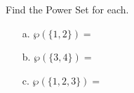 \documentclass[a4paper,12pt]{book}
\newcounter{question}
\begin{document}
        \begin{questionNOGRADE}{\thequestion}

            Find the Power Set for each.

            \begin{enumerate}
                \item[a.]   $\wp( \{1, 2\} ) = $
                \item[b.]   $\wp( \{3, 4\} ) = $
                \item[c.]   $\wp( \{1, 2, 3\} ) = $
            \end{enumerate}

        \end{questionNOGRADE}





        
\end{document}
